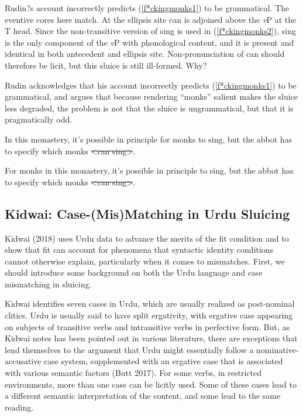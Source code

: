 \documentclass{turabian-researchpaper}
\begin{document}
Rudin?s account incorrectly predicts (\ref{f*ckingmonks1}) to be grammatical. The eventive cores here match. At the ellipsis site can is adjoined above the \textit{v}P at the T head. Since the non-transitive version of sing is used in (\ref{f*ckingmonks2}), sing is the only component of the \textit{v}P with phonological content, and it is present and identical in both antecedent and ellipsis site. Non-pronunciation of can should therefore be licit, but this sluice is still ill-formed. Why? 

Rudin acknowledges that his account incorrectly predicts (\ref{f*ckingmonks1}) to be grammatical, and argues that because rendering ``monks'' salient makes the sluice less degraded, the problem is not that the sluice is ungrammatical, but that it is pragmatically odd. 

\begin{exe}
\ex\label{f*ckingmonks3} In this monastery, it's possible in principle for monks to sing, but the abbot has to specify which monks \sout{\textless can sing\textgreater}.
\end{exe}

\begin{exe}
\ex\label{f*ckingmonks4} For monks in this monastery, it's possible in principle to sing, but the abbot has to specify which monks \sout{\textless can sing\textgreater}.
\end{exe} 

\subsection{Kidwai: Case-(Mis)Matching in Urdu Sluicing}

Kidwai (2018) uses Urdu data to advance the merits of the fit condition and to show that fit can account for phenomena that syntactic identity conditions cannot otherwise explain, particularly when it comes to mismatches. First, we should introduce some background on both the Urdu language and case mismatching in sluicing. 

Kidwai identifies seven cases in Urdu, which are usually realized as post-nominal clitics. Urdu is usually said to have split ergativity, with ergative case appearing on subjects of transitive verbs and intransitive verbs in perfective form. But, as Kidwai notes has been pointed out in various literature, there are exceptions that lend themselves to the argument that Urdu might essentially follow a nominative-accusative case system, supplemented with an ergative case that is associated with various semantic factors (Butt 2017). For some verbs, in restricted environments, more than one case can be licitly used. Some of these cases lead to a different semantic interpretation of the content, and some lead to the same reading. 
\end{document}
